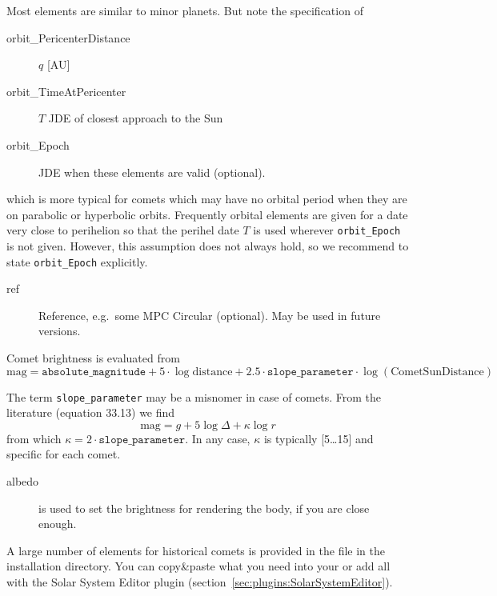 Most elements are similar to minor planets. But note the specification of
\begin{description}
\item[orbit\_PericenterDistance] $q$ [AU]
\item[orbit\_TimeAtPericenter] $T$  JDE of closest approach to the Sun
\item[orbit\_Epoch] JDE when these elements are valid (optional).
\end{description}
which is more typical for comets which may have no orbital period when
they are on parabolic or hyperbolic orbits. Frequently orbital
elements are given for a date very close to perihelion so that the
perihel date $T$ is used wherever 
\texttt{orbit\_Epoch} is not given. However, this assumption does not always hold,
so we recommend to state \texttt{orbit\_Epoch} explicitly.

\begin{description}
\item[ref] Reference, e.g.\ some MPC Circular (optional).  May be used in future versions.
\end{description}

Comet brightness is evaluated from
\begin{equation}
  \label{eq:comet_magnitudes}
  \mathrm{mag}=\mathtt{absolute\_magnitude}+5\cdot\log{\mathrm{distance}} + 2.5\cdot\mathtt{slope\_parameter}\cdot\log(\mathrm{CometSunDistance})
\end{equation}

The term \texttt{slope\_parameter} may be a misnomer in case of
comets. From the literature \citep{AstronomicalAlgorithms:1998} (equation 33.13) we find
\begin{equation}
  \label{eq:comet_magnitudes_Meeus}
  \mathrm{mag}=g+5\log\Delta + \kappa\log r
\end{equation}
from which $\kappa=2\cdot\mathtt{slope\_parameter}$. In any case, $\kappa$ is typically [5\ldots15] and specific for each comet.

\begin{description}
\item[albedo] is used to set the brightness for rendering the body,
if you are close enough. 
\end{description}

A large number of elements for historical comets is provided in the
file  in the installation directory. You
can copy\&paste what you need into your
 or add all with the Solar System Editor plugin (section~\ref{sec:plugins:SolarSystemEditor}). 



